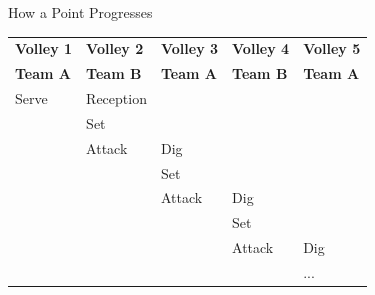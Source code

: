 \documentclass[handout]{beamer}
\begin{document}
\begin{frame}[noframenumbering]{How a Point Progresses}
  \centering
  \begin{tabular}{lllll}
    \bf Volley 1  & \bf Volley 2  & \bf Volley 3  & \bf Volley 4  & \bf Volley 5\\
    \bf Team A    & \bf Team B    & \bf Team A    & \bf Team B    & \bf Team A\\
    \hline
    \cline{1-2}
    \multicolumn{1}{|l}{Serve}  & \multicolumn{1}{l|}{Reception}\\
    \cline{1-2}
    \cline{2-3}
                                & \multicolumn{1}{|l}{Set}    & \multicolumn{1}{l|}{}\\
                                & \multicolumn{1}{|l}{Attack} & \multicolumn{1}{l|}{Dig}\\
    \cline{2-3}
    \cline{3-4}
                                &                             & \multicolumn{1}{|l}{Set}    & \multicolumn{1}{l|}{}\\
                                &                             & \multicolumn{1}{|l}{Attack} & \multicolumn{1}{l|}{Dig}\\
    \cline{3-4}
    \cline{4-5}
                                &                             &                             & \multicolumn{1}{|l}{Set}    & \multicolumn{1}{l|}{}\\
                                &                             &                             & \multicolumn{1}{|l}{Attack} & \multicolumn{1}{l|}{Dig}\\
    \cline{4-5}
                                &                             &                             &                             & ...
  \end{tabular}
\end{frame}
\end{document}
